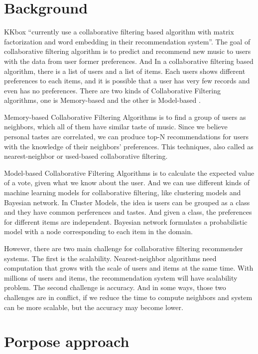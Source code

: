 \section{Background}
KKbox ``currently use a collaborative filtering based algorithm with matrix factorization and word embedding in their recommendation system''\cite{kaggle-kkbox-challenge}. The goal of collaborative filtering algorithm is to predict and recommend new music to users with the data from user former preferences. And In a collaborative filtering based algorithm, there is a list of users and a list of items. Each users shows different preferences to each items, and it is possible that a user has very few records and even has no preferences. There are two kinds of Collaborative Filtering algorithms, one is Memory-based  and the other is Model-based .\cite{item-basd-cf} 

Memory-based Collaborative Filtering Algorithms is to find a group of users as neighbors, which all of them have similar taste of music. Since we believe personal tastes are correlated, we can produce top-N recommendations for users with the knowledge of their neighbors' preferences. This techniques, also called as nearest-neighbor or used-based collaborative filtering.

Model-based Collaborative Filtering Algorithms is to calculate the expected value of a vote, given what we know about the user.\cite{Breese-Heckerman-Kadie} And we can use different kinds of machine learning models for collaborative filtering, like clustering models and Bayesian network. In Cluster Models, the idea is users can be grouped as a class and they have common perferences and tastes. And given a class, the preferences for different items are independent. Bayesian network formulates a probabilistic model with a node corresponding to each item in the domain.

However, there are two main challenge for collaborative filtering recommender systems.\cite{item-basd-cf}  The first is the scalability. Nearest-neighbor algorithms need computation that grows with the scale of users and items at the same time. With millions of users and items, the recommendation system will have scalability problem. The second challenge is accuracy. And in some ways, those two challenges are in conflict, if we reduce the time to compute neighbors and system can be more scalable, but the accuracy may become lower.




\section{Porpose approach}


